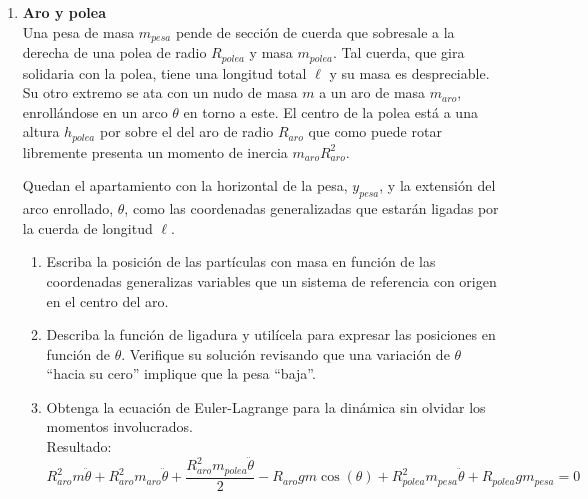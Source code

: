 \documentclass[11pt, spanish, a4paper, twoside]{article}
\begin{document}
\begin{enumerate}
	\item 
	\begin{minipage}[t][6cm]{0.57\textwidth}
		\textbf{Aro y polea}\\
		Una pesa de masa \(m_{pesa}\) pende de sección de cuerda que sobresale a la derecha de una polea de radio \(R_{polea}\) y masa \(m_{polea}\).
		Tal cuerda, que gira solidaria con la polea, tiene una longitud total \(\ell\) y su masa es despreciable.
		Su otro extremo se ata con un nudo de masa \(m\) a un aro de masa \(m_{aro}\), enrollándose en un arco \(\theta\) en torno a este.
		El centro de la polea está a una altura \(h_{polea}\) por sobre el del aro de radio \(R_{aro}\) que como puede rotar libremente presenta un momento de inercia \(m_{aro} R_{aro}^2\).

		Quedan el apartamiento con la horizontal de la pesa, \(y_{pesa}\), y la extensión del arco enrollado, \(\theta\), como las coordenadas generalizadas que estarán ligadas por la cuerda de longitud \(\ell\).
	\end{minipage}
	\begin{minipage}[c][1.5cm][t]{0.2\textwidth}
		
	\end{minipage}
	\begin{enumerate}
		\item Escriba la posición de las partículas con masa en función de las coordenadas generalizas variables que  un sistema de referencia con origen en el centro del aro.
		\item Describa la función de ligadura y utilícela para expresar las posiciones en función de \(\theta\).
		Verifique su solución revisando que una variación de \(\theta\) ``hacia su cero'' implique que la pesa ``baja''. 
		\item Obtenga la ecuación de Euler-Lagrange para la dinámica sin olvidar los momentos involucrados.\\
		Resultado:
		\(
			R_{aro}^{2} m \ddot{\theta} + R_{aro}^{2} m_{aro} \ddot{\theta} + \dfrac{R_{aro}^{2} m_{polea} \ddot{\theta}}{2} - R_{aro} g m \cos{\left(\theta \right)} + R_{polea}^{2} m_{pesa} \ddot{\theta} + R_{polea} g m_{pesa} = 0
		\)
	\end{enumerate}



\end{enumerate}
\end{document}
